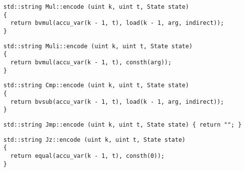\begin{lstlisting}[style=c++]
std::string Mul::encode (uint k, uint t, State state)
{
  return bvmul(accu_var(k - 1, t), load(k - 1, arg, indirect));
}
\end{lstlisting}


\begin{lstlisting}[style=c++]
std::string Muli::encode (uint k, uint t, State state)
{
  return bvmul(accu_var(k - 1, t), consth(arg));
}
\end{lstlisting}


\begin{lstlisting}[style=c++]
std::string Cmp::encode (uint k, uint t, State state)
{
  return bvsub(accu_var(k - 1, t), load(k - 1, arg, indirect));
}
\end{lstlisting}


\begin{lstlisting}[style=c++]
std::string Jmp::encode (uint k, uint t, State state) { return ""; }
\end{lstlisting}


\begin{lstlisting}[style=c++]
std::string Jz::encode (uint k, uint t, State state)
{
  return equal(accu_var(k - 1, t), consth(0));
}
\end{lstlisting}

